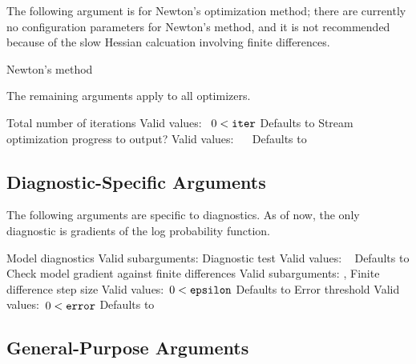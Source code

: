 %
The following argument is for Newton's optimization method;  there are
currently no configuration parameters for Newton's method, and it is
not recommended because of the slow Hessian calcuation involving
finite differences.
%
\begin{description}
        {Newton's method}
%
\end{description}
%
The remaining arguments apply to all optimizers.
\begin{description}
%
      {Total number of iterations}
      {Valid values: \  $0 < \mbox{{\tt iter}}$}
      {Defaults to }
%
      {Stream optimization progress to output?}
      {Valid values: \  \ }
      {Defaults to }
%
\end{description}

\subsection{Diagnostic-Specific Arguments}

The following arguments are specific to diagnostics.  As of now, the
only diagnostic is gradients of the log probability function.

\begin{description}

    {Model diagnostics}
    {Valid subarguments: }
%
      {Diagnostic test}
      {Valid values: \  }
      {Defaults to }
%
        {Check model gradient against finite differences}
        {Valid subarguments: , }
%
        {Finite difference step size}
	    {Valid values:\ $0 < \mbox{{\tt epsilon}}$}
	    {Defaults to }
%
       {Error threshold}
	   {Valid values:\ $0 < \mbox{{\tt error}}$}
	   {Defaults to }
%
\end{description}

\subsection{General-Purpose Arguments}

